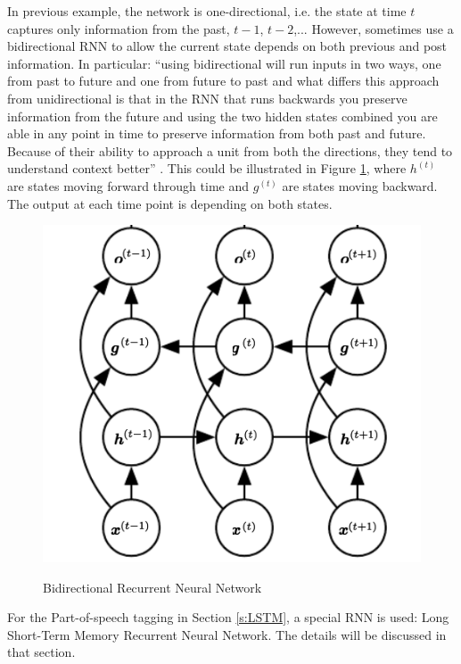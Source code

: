 \documentclass[11pt]{article}
\theoremstyle{plain}
\begin{document}
In previous example, the network is one-directional, i.e. the state at time $t$ 
captures only information from the past, $t-1$, $t-2$,... However, sometimes 
use a bidirectional RNN to allow the current state depends on both previous 
and post information. In particular: ``using bidirectional will run inputs in two 
ways, one from past to future and one from future to past and what differs 
this approach from unidirectional is that in the RNN that runs backwards you 
preserve information from the future and using the two hidden states 
combined you are able in any point in time to preserve information from both 
past and future. Because of their ability to approach a unit from both the 
directions, they tend to understand context better'' 
\cite{aneesh-joshi-LSTM-POS-Tagger}. This could be illustrated in Figure 
\ref{fg:bi-rnn}, where $h^{(t)}$ are states moving forward through time and 
$g^{(t)}$ are states moving backward. The output at each time point is 
depending on both states. 
\begin{figure}[!ht]
	\centering\includegraphics[width=0.7\columnwidth]{images/bi-rnn.png}
	\caption{Bidirectional Recurrent Neural Network 
	}\label{fg:bi-rnn}	\cite{Goodfellow-et-al-2016}
\end{figure}

For the Part-of-speech tagging in Section \ref{s:LSTM}, a special RNN is 
used: Long Short-Term Memory Recurrent Neural Network. The details will be 
discussed in that section. 
\end{document}
